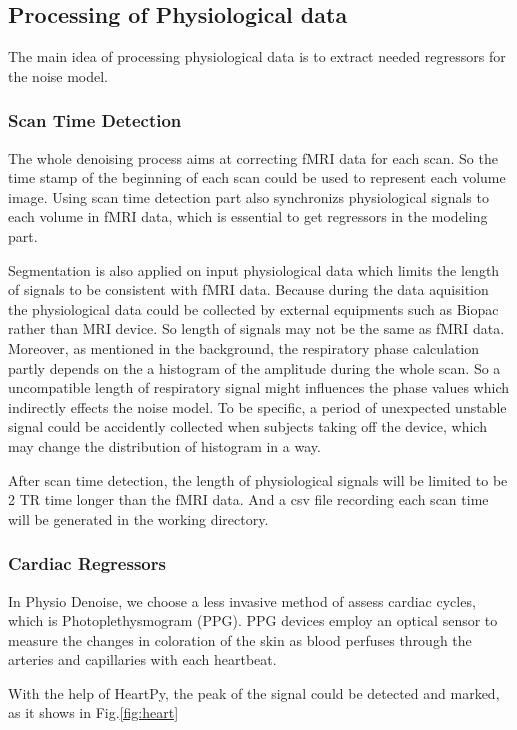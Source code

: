 \subsection{Processing of Physiological data}
The main idea of processing physiological data is to extract needed regressors for the noise model.

\subsubsection{Scan Time Detection}
The whole denoising process aims at correcting fMRI data for each scan. 
So the time stamp of the beginning of each scan could be used to represent each volume image. 
Using scan time detection part also synchronizs physiological signals to each volume in fMRI data,
which is essential to get regressors in the modeling part.

Segmentation is also applied on input physiological data which
limits the length of signals to be consistent with fMRI data. Because during the data aquisition the physiological
data could be collected by external equipments such as Biopac rather than MRI device.
So length of signals may not be the same as fMRI data. Moreover, as mentioned in the background, the respiratory phase calculation 
partly depends on the a histogram of the amplitude during the whole scan. So a uncompatible length of 
respiratory signal might influences the phase values which indirectly effects the noise model. To be specific, 
a period of unexpected unstable signal could be accidently collected when subjects taking off the 
device, which may change the distribution of histogram in a way.

After scan time detection, the length of physiological signals will be limited to be 2 TR time longer than the 
fMRI data. And a csv file recording each scan time will be generated in the working directory.

\subsubsection{Cardiac Regressors}

In Physio Denoise, we choose a less invasive method of assess cardiac cycles, which is Photoplethysmogram (PPG). 
PPG devices employ an optical sensor to measure the changes in coloration of the skin as blood perfuses through the arteries and capillaries with each heartbeat.\cite{van2019heartpy}

With the help of HeartPy, the peak of the signal could be detected and marked, as it shows in Fig.\ref{fig:heart}

